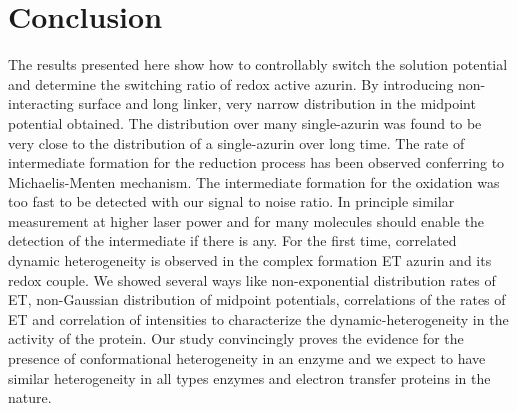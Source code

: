 \documentclass[journal=jacsat,manuscript=article]{achemso}
\begin{document}
\section{Conclusion}
The results presented here show how to controllably switch the solution potential and determine the switching ratio of redox active azurin.
By introducing non-interacting surface and long linker, very narrow distribution in the midpoint potential obtained.
The distribution over many single-azurin was found to be very close to the distribution of a single-azurin over long time.
The rate of intermediate formation for the reduction process has been observed conferring to Michaelis-Menten mechanism.
The intermediate formation for the oxidation was too fast to be detected with our signal to noise ratio.
In principle similar measurement at higher laser power and for many molecules should enable the detection of the intermediate if there is any.
For the first time, correlated dynamic heterogeneity is observed in the complex formation ET azurin and its redox couple.
We showed several ways like non-exponential distribution rates of ET, non-Gaussian distribution of midpoint potentials, correlations of the rates of ET and correlation of intensities to  characterize the dynamic-heterogeneity in the activity of the protein.
Our study convincingly proves the evidence for the presence of conformational heterogeneity in an enzyme and we expect to have similar heterogeneity in all types enzymes and electron transfer proteins in the nature.

% 

\end{document}
